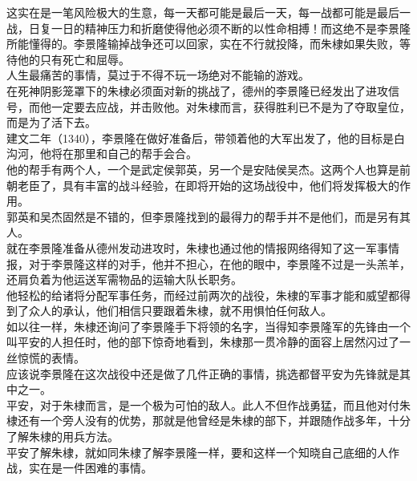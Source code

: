 \begin{multicols}{\theparacolNo}
这实在是一笔风险极大的生意，每一天都可能是最后一天，每一战都可能是最后一战，日复一日的精神压力和折磨使得他必须不断的以性命相搏！而这绝不是李景隆所能懂得的。李景隆输掉战争还可以回家，实在不行就投降，而朱棣如果失败，等待他的只有死亡和屈辱。\\

人生最痛苦的事情，莫过于不得不玩一场绝对不能输的游戏。\\

在死神阴影笼罩下的朱棣必须面对新的挑战了，德州的李景隆已经发出了进攻信号，而他一定要去应战，并击败他。对朱棣而言，获得胜利已不是为了夺取皇位，而是为了活下去。\\

建文二年（1340），李景隆在做好准备后，带领着他的大军出发了，他的目标是白沟河，他将在那里和自己的帮手会合。\\

他的帮手有两个人，一个是武定侯郭英，另一个是安陆侯吴杰。这两个人也算是前朝老臣了，具有丰富的战斗经验，在即将开始的这场战役中，他们将发挥极大的作用。\\

郭英和吴杰固然是不错的，但李景隆找到的最得力的帮手并不是他们，而是另有其人。\\

就在李景隆准备从德州发动进攻时，朱棣也通过他的情报网络得知了这一军事情报，对于李景隆这样的对手，他并不担心，在他的眼中，李景隆不过是一头羔羊，还肩负着为他运送军需物品的运输大队长职务。\\

他轻松的给诸将分配军事任务，而经过前两次的战役，朱棣的军事才能和威望都得到了众人的承认，他们相信只要跟着朱棣，就不用惧怕任何敌人。\\

如以往一样，朱棣还询问了李景隆手下将领的名字，当得知李景隆军的先锋由一个叫平安的人担任时，他的部下惊奇地看到，朱棣那一贯冷静的面容上居然闪过了一丝惊慌的表情。\\

应该说李景隆在这次战役中还是做了几件正确的事情，挑选都督平安为先锋就是其中之一。\\

平安，对于朱棣而言，是一个极为可怕的敌人。此人不但作战勇猛，而且他对付朱棣还有一个旁人没有的优势，那就是他曾经是朱棣的部下，并跟随作战多年，十分了解朱棣的用兵方法。\\

平安了解朱棣，就如同朱棣了解李景隆一样，要和这样一个知晓自己底细的人作战，实在是一件困难的事情。\\


\end{multicols}
